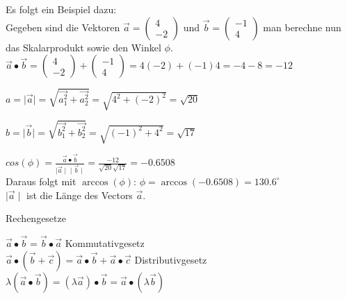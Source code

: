 Es folgt ein Beispiel dazu:\\
Gegeben sind die Vektoren 
$\vec{a} = \begin{pmatrix} 4 \\ -2 \end{pmatrix}$
und
$\vec{b} = \begin{pmatrix} -1 \\ 4 \end{pmatrix}$
man berechne nun das Skalarprodukt sowie den Winkel $\phi$.\\

\begin{math}
	\vec{a} \bullet \vec{b} = 
	\begin{pmatrix} 4 \\ -2 \end{pmatrix} + 
	\begin{pmatrix} -1 \\ 4 \end{pmatrix} =
	4 (-2) + (-1) 4 = -4 -8 = -12
\end{math}

\begin{math}
	a = \mid \vec{a} \mid = 
	\sqrt{\vec{a_{1}^2} + \vec{a_{2}^2}} =
	\sqrt{4^2 + (-2)^2} =
	\sqrt{20}
\end{math}

\begin{math}
	b = \mid \vec{b} \mid = 
	\sqrt{\vec{b_{1}^2} + \vec{b_{2}^2}} =
	\sqrt{(-1)^2 + 4^2} =
	\sqrt{17}
\end{math}

\begin{math}
	cos(\phi) =
	\frac{\vec{a} \bullet \vec{b}}{\mid \vec{a} \mid \dot \mid \vec{b} \mid} = 
	\frac{-12}{\sqrt{20} \sqrt{17}} = 
	-0.6508
\end{math}
\\Daraus folgt mit $\arccos(\phi)$:
\begin{math}
	\phi = \arccos(-0.6508) = 130.6^\circ
\end{math}
\\$\mid \vec{a} \mid$ ist die Länge des Vectors $\vec{a}$.

\begin{description}
	\item[Rechengesetze]
\end{description}
$\vec{a} \bullet \vec{b} = \vec{b} \bullet \vec{a}$ Kommutativgesetz\\
$\vec{a} \bullet (\vec{b} + \vec{c}) = 
\vec{a} \bullet \vec{b} + \vec{a} \bullet \vec{c}$
Distributivgesetz\\
$\lambda (\vec{a} \bullet \vec{b}) = 
(\lambda \vec{a}) \bullet \vec{b} = 
\vec{a} \bullet (\lambda \vec{b})$

